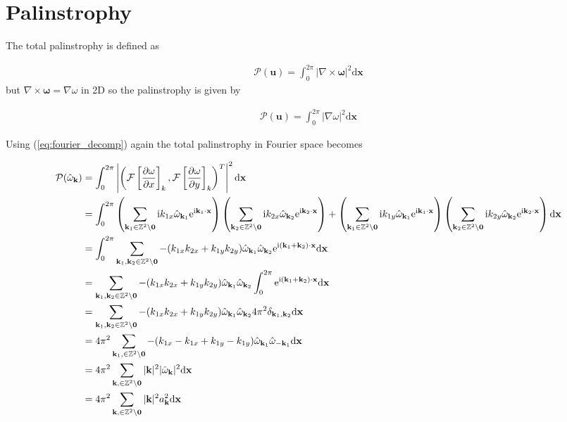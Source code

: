 \documentclass[9pt]{article}
\newcommand{\pder}[2]{\frac{\partial #1}{\partial #2}}               %
\newcommand{\ii}{\mathrm{i}}      								  %
\newcommand{\e}{\mathrm{e}}      								  %
\newcommand{\grad}[1]{\nabla{#1}}								%
\newcommand{\curl}[1]{\nabla \times {#1}}								%
\newcommand{\bfu}{\mathbf{u}}											%
\newcommand{\omegahat}[1]{\hat{\omega}_{ \mathbf{#1} } }								%
\newcommand{\bfx}{\mathbf{x}}								%
\newcommand{\bfk}{\mathbf{k}}								%
\newcommand{\bfkn}[1]{\mathbf{k}_{#1}}								%
\begin{document}
\section{Palinstrophy}

 The total palinstrophy is defined as 

 \begin{align}
 \mathcal{P}(\bfu) = \int_0^{2\pi} |\curl{\bm{\omega}}|^2\mathrm{d}\bfx
 \end{align}	
but $\curl{\bm{\omega}} = \grad{\omega}$ in 2D so the palinstrophy is given by

\begin{align}
\mathcal{P}(\bfu) = \int_0^{2\pi} |\grad{\omega}|^2\mathrm{d}\bfx
\end{align}

Using (\ref{eq:fourier_decomp}) again the total palinstrophy in Fourier space becomes

\begin{align}
\mathcal{P}(\omegahat{k}) &= \int_0^{2\pi} \left|\left(\mathcal{F}\left[\pder{\omega}{x}\right]_k, \mathcal{F}\left[\pder{\omega}{y}\right]_k \right)^{T} \right|^2\mathrm{d}\bfx \notag \\
&=  \int_0^{2\pi} \left(\sum_{\mathbf{k}_1\in \mathbb{Z}^2\setminus \mathbf{0}}\ii k_{1x}\hat{\omega}_{\mathbf{k}_1}\e^{\ii \mathbf{k}_1\cdot \mathbf{x}}\right)\left(\sum_{\mathbf{k}_2\in \mathbb{Z}^2\setminus \mathbf{0}}\ii k_{2x}\hat{\omega}_{\mathbf{k}_2}\e^{\ii \mathbf{k}_2\cdot \mathbf{x}}\right) + \left(\sum_{\mathbf{k}_1\in \mathbb{Z}^2\setminus \mathbf{0}}\ii k_{1y}\hat{\omega}_{\mathbf{k}_1}\e^{\ii \mathbf{k}_1\cdot \mathbf{x}}\right)\left(\sum_{\mathbf{k}_2\in \mathbb{Z}^2\setminus \mathbf{0}}\ii k_{2y}\hat{\omega}_{\mathbf{k}_2}\e^{\ii \mathbf{k}_2\cdot \mathbf{x}}\right) \mathrm{d}\bfx \notag\\
&= \int_0^{2\pi} \sum_{\mathbf{k}_1, \mathbf{k}_2\in \mathbb{Z}^2\setminus \mathbf{0}} -(k_{1x}k_{2x} + k_{1y}k_{2y})\hat{\omega}_{\bfkn{1}}\hat{\omega}_{\bfkn{2}}\e^{\ii (\bfkn{1} + \bfkn{2}) \cdot \bfx}\mathrm{d}\bfx \notag\\
&=  \sum_{\mathbf{k}_1, \mathbf{k}_2\in \mathbb{Z}^2\setminus \mathbf{0}} -(k_{1x}k_{2x} + k_{1y}k_{2y})\hat{\omega}_{\bfkn{1}}\hat{\omega}_{\bfkn{2}}\int_0^{2\pi}\e^{\ii (\bfkn{1} + \bfkn{2}) \cdot \bfx}\mathrm{d}\bfx \notag\\
&=  \sum_{\mathbf{k}_1, \mathbf{k}_2\in \mathbb{Z}^2\setminus \mathbf{0}} -(k_{1x}k_{2x} + k_{1y}k_{2y})\hat{\omega}_{\bfkn{1}}\hat{\omega}_{\bfkn{2}} 4\pi^2 \delta_{\bfkn{1}, \bfkn{2}}\mathrm{d}\bfx \notag\\
&=  4\pi^2 \sum_{\mathbf{k}_1, \in \mathbb{Z}^2\setminus \mathbf{0}} -(k_{1x}-k_{1x} + k_{1y}-k_{1y})\hat{\omega}_{\bfkn{1}}\hat{\omega}_{-\bfkn{1}} \mathrm{d}\bfx \notag\\
&=  4\pi^2 \sum_{\mathbf{k}, \in \mathbb{Z}^2\setminus \mathbf{0}} |\bfk|^2 |\hat{\omega}_{\bfk}|^2 \mathrm{d}\bfx \notag\\
&=  4\pi^2 \sum_{\mathbf{k}, \in \mathbb{Z}^2\setminus \mathbf{0}} |\bfk|^2 a_{\bfk}^2 \mathrm{d}\bfx \notag\\
\label{eq:palinstrophy_fourier}
\end{align}
\end{document}
